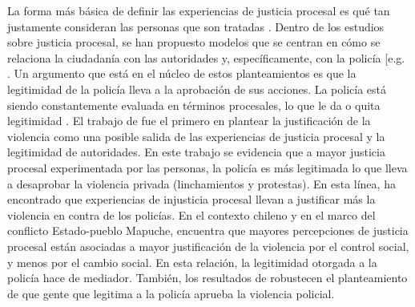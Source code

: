\documentclass[12pt,twoside]{templates/facsothesis}
\begin{document}
La forma más básica de definir las experiencias de justicia procesal es qué tan justamente consideran las personas que son tratadas \citep{Tyler2003, Vermunt2016}. Dentro de los estudios sobre justicia procesal, se han propuesto modelos que se centran en cómo se relaciona la ciudadanía con las autoridades y, específicamente, con la policía {[}e.g. \citet{Tyler2003}. Un argumento que está en el núcleo de estos planteamientos es que la legitimidad de la policía lleva a la aprobación de sus acciones. La policía está siendo constantemente evaluada en términos procesales, lo que le da o quita legitimidad \citep{Bradford2017}. El trabajo de \citet{Jackson2013} fue el primero en plantear la justificación de la violencia como una posible salida de las experiencias de justicia procesal y la legitimidad de autoridades. En este trabajo se evidencia que a mayor justicia procesal experimentada por las personas, la policía es más legitimada lo que lleva a desaprobar la violencia privada (linchamientos y protestas). En esta línea, \citet{Maguire2016} ha encontrado que experiencias de injusticia procesal llevan a justificar más la violencia en contra de los policías. En el contexto chileno y en el marco del conflicto Estado-pueblo Mapuche, \citet{Gerber2017} encuentra que mayores percepciones de justicia procesal están asociadas a mayor justificación de la violencia por el control social, y menos por el cambio social. En esta relación, la legitimidad otorgada a la policía hace de mediador. También, los resultados de \citet{Bradford2017} robustecen el planteamiento de que gente que legitima a la policía aprueba la violencia policial.
\end{document}
